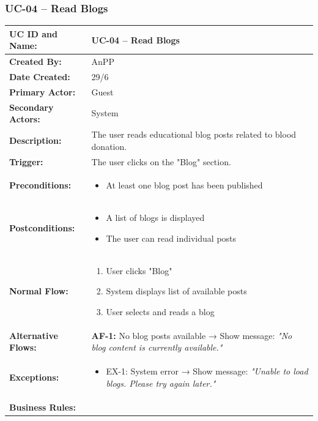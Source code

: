 \documentclass[12pt,a4paper]{article}
\begin{document}
\subsubsection{UC-04 – Read Blogs}

\renewcommand{\arraystretch}{1.5}
\begin{longtable}{|p{4.5cm}|p{10.5cm}|}
\hline
\textbf{UC ID and Name:} & UC-04 – Read Blogs \\
\hline
\textbf{Created By:} & AnPP \\
\hline
\textbf{Date Created:} & 29/6 \\
\hline
\textbf{Primary Actor:} & Guest \\
\hline
\textbf{Secondary Actors:} & System \\
\hline
\textbf{Description:} & The user reads educational blog posts related to blood donation. \\
\hline
\textbf{Trigger:} & The user clicks on the "Blog" section. \\
\hline
\textbf{Preconditions:} &
\begin{itemize}
  \item At least one blog post has been published
\end{itemize} \\
\hline
\textbf{Postconditions:} &
\begin{itemize}
  \item A list of blogs is displayed
  \item The user can read individual posts
\end{itemize} \\
\hline
\textbf{Normal Flow:} &
\begin{enumerate}
  \item User clicks "Blog"
  \item System displays list of available posts
  \item User selects and reads a blog
\end{enumerate} \\
\hline
\textbf{Alternative Flows:} &
\textbf{AF-1:} No blog posts available → Show message: \textit{"No blog content is currently available."} \\
\hline
\textbf{Exceptions:} &
\begin{itemize}
  \item EX-1: System error → Show message: \textit{"Unable to load blogs. Please try again later."}
\end{itemize} \\
\hline
\textbf{Business Rules:} &

\end{longtable}
\end{document}
